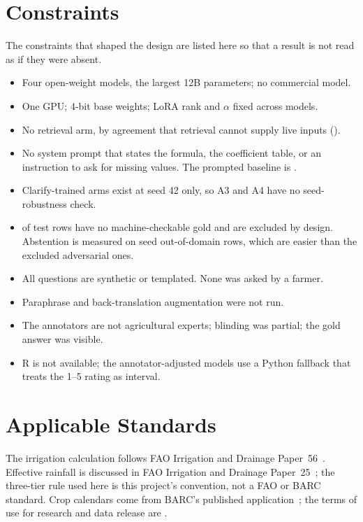 \section{Constraints}
\label{sec:constraints}

The constraints that shaped the design are listed here so that a result is not read as if they were absent.

\begin{itemize}
  \item Four open-weight models, the largest 12B parameters; no commercial model.
  \item One GPU; 4-bit base weights; LoRA rank and $\alpha$ fixed across models.
  \item No retrieval arm, by agreement that retrieval cannot supply live inputs ().
  \item No system prompt that states the formula, the coefficient table, or an instruction to ask for missing values. The prompted baseline is .
  \item Clarify-trained arms exist at seed 42 only, so A3 and A4 have no seed-robustness check.
  \item \TestExcluded of \TestRows test rows have no machine-checkable gold and are excluded by design. Abstention is measured on \TestAbstain seed out-of-domain rows, which are easier than the excluded adversarial ones.
  \item All questions are synthetic or templated. None was asked by a farmer.
  \item Paraphrase and back-translation augmentation were not run.
  \item The annotators are not agricultural experts; blinding was partial; the gold answer was visible.
  \item R is not available; the annotator-adjusted models use a Python fallback that treats the 1--5 rating as interval.
\end{itemize}

\section{Applicable Standards}
\label{sec:standards}

The irrigation calculation follows FAO Irrigation and Drainage Paper~56~\cite{allen1998fao56}. Effective rainfall is discussed in FAO Irrigation and Drainage Paper~25~\cite{dastane1978effective}; the three-tier rule used here is this project's convention, not a FAO or BARC standard. Crop calendars come from BARC's published application~\cite{barc2026cropcalendar}; the terms of use for research and data release are .

